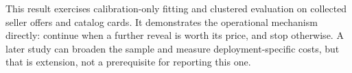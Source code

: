 \begin{table}[htbp]
  \centering
  \small
  
  \caption{Held-out UCP recall-aware cost sensitivity. Multiples scale the complete
  declared catalog-expansion workload, whose current $1\times$ cost is generated from
  the dated provider rate card. Difference is adaptive minus costed search-all;
  lower is better.}
  \label{tab:ucp-cost-sensitivity}
\end{table}


This result exercises calibration-only fitting and clustered evaluation on collected
seller offers and catalog cards. It demonstrates the operational mechanism directly:
continue when a further reveal is worth its price, and stop otherwise. A later study
can broaden the sample and measure deployment-specific costs, but that is extension,
not a prerequisite for reporting this one.